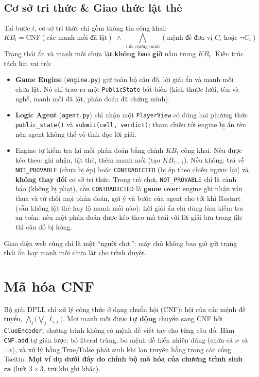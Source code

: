 \documentclass{article}
\newcommand{\code}[1]{\texttt{#1}}
\newcommand{\KB}{\mathit{KB}}
\begin{document}
\subsection{Cơ sở tri thức \& Giao thức lật thẻ}
Tại bước $t$, cơ sở tri thức chỉ gồm thông tin công khai:
\begin{equation}
\KB_t = \text{CNF}(\text{các manh mối đã lật}) \;\land\; \bigwedge_{i \text{ đã chứng minh}} (\text{mệnh đề đơn vị } C_i \text{ hoặc } \neg C_i)
\end{equation}
Trạng thái ẩn và manh mối chưa lật \textbf{không bao giờ} nằm trong $\KB_t$. Kiến trúc tách hai vai trò:
\begin{itemize}[noitemsep]
    \item \textbf{Game Engine} (\code{engine.py}) giữ toàn bộ câu đố, lời giải ẩn và manh mối chưa lật. Nó chỉ trao ra một \code{PublicState} bất biến (kích thước lưới, tên và nghề, manh mối đã lật, phán đoán đã chứng minh).
    \item \textbf{Logic Agent} (\code{agent.py}) chỉ nhận một \code{PlayerView} có đúng hai phương thức \code{public\_state()} và \code{submit(cell, verdict)}; tham chiếu tới engine bị ẩn tên nên agent không thể vô tình đọc lời giải.
    \item Engine tự kiểm tra lại mỗi phán đoán bằng chính $\KB_t$ công khai. Nếu được kéo theo: ghi nhận, lật thẻ, thêm manh mối (tạo $\KB_{t+1}$). Nếu không: trả về \code{NOT\_PROVABLE} (chưa bị ép) hoặc \code{CONTRADICTED} (bị ép theo chiều ngược lại) và \textbf{không thay đổi} cơ sở tri thức. Trong trò chơi, \code{NOT\_PROVABLE} chỉ là cảnh báo (không bị phạt), còn \code{CONTRADICTED} là \textbf{game over}: engine ghi nhận ván thua và từ chối mọi phán đoán, gợi ý và bước của agent cho tới khi Restart (vẫn không lật thẻ hay lộ manh mối nào). Lời giải ẩn chỉ dùng làm kiểm tra an toàn: nếu một phán đoán được kéo theo mà trái với lời giải lưu trong file thì câu đố bị hỏng.
\end{itemize}
Giao diện web cũng chỉ là một ``người chơi'': máy chủ không bao giờ gửi trạng thái ẩn hay manh mối chưa lật cho trình duyệt.

\section{Mã hóa CNF}

Bộ giải DPLL chỉ xử lý công thức ở dạng chuẩn hội (CNF): hội của các mệnh đề tuyển, $\bigwedge_i \big( \bigvee_j \ell_{i,j} \big)$. Mọi manh mối được \textbf{tự động} chuyển sang CNF bởi \code{ClueEncoder}; chương trình không có mệnh đề viết tay cho từng câu đố. Hàm \code{CNF.add} tự giản lược: bỏ literal trùng, bỏ mệnh đề hiển nhiên đúng (chứa cả $x$ và $\neg x$), và xử lý hằng True/False phát sinh khi lan truyền hằng trong các cổng Tseitin. \textbf{Mọi ví dụ dưới đây do chính bộ mã hóa của chương trình sinh ra} (lưới $3\times3$, trừ khi ghi khác).
\end{document}
